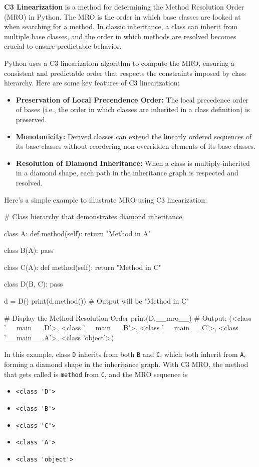 \begin{airesult}
\textbf{C3 Linearization} is a method for determining the Method Resolution
Order (MRO) in Python. The MRO is the order in which base classes are looked at
when searching for a method. In classic inheritance, a class can inherit from
multiple base classes, and the order in which methods are resolved becomes
crucial to ensure predictable behavior.

Python uses a C3 linearization algorithm to compute the MRO, ensuring a
consistent and predictable order that respects the constraints imposed by class
hierarchy. Here are some key features of C3 linearization:

\begin{itemize}
  \item \textbf{Preservation of Local Precendence Order:} The local precedence
order of bases (i.e., the order in which classes are inherited in a class
definition) is preserved.
  \item \textbf{Monotonicity:} Derived classes can extend the linearly ordered
sequences of its base classes without reordering non-overridden elements of its
base classes.
  \item \textbf{Resolution of Diamond Inheritance:} When a class is
multiply-inherited in a diamond shape, each path in the inheritance graph is
respected and resolved.
\end{itemize}

Here's a simple example to illustrate MRO using C3 linearization:

\begin{python}
# Class hierarchy that demonstrates diamond inheritance

class A:
  def method(self):
    return "Method in A"

class B(A):
  pass

class C(A):
  def method(self):
    return "Method in C"

class D(B, C):
  pass

d = D()
print(d.method())  # Output will be "Method in C"

# Display the Method Resolution Order
print(D.__mro__)  # Output: (<class '__main__.D'>, <class '__main__.B'>, <class
'__main__.C'>, <class '__main__.A'>, <class 'object'>)
\end{python}

In this example, class \verb|D| inherits from both \verb|B| and \verb|C|,
which both inherit from \verb|A|, forming a diamond shape in the inheritance
graph. With C3 MRO, the method that gets called is \verb|method| from
\verb|C|, and the MRO sequence is
\begin{itemize}
  \item \verb|<class 'D'>|
  \item \verb|<class 'B'>|
  \item \verb|<class 'C'>|
  \item \verb|<class 'A'>|
  \item \verb|<class 'object'>|
\end{itemize}
\end{airesult}


